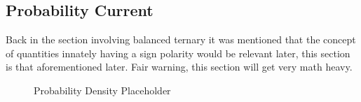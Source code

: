 \documentclass[a4paper]{article}
\begin{document}


\subsection{Probability Current} %
\label{ternaryRelevance} %

Back in the section involving balanced ternary it was mentioned that the concept of quantities innately having a sign polarity would be relevant later, this section is that aforementioned later. Fair warning, this section will get very math heavy. \newline
\newline


\label{FigureisThecommandYouAlwaysForget}%
\label{captionIsTheOtherOne}




\begin{figure} %
	\caption{Probability Density Placeholder}\label{ProbDensity1}
\end{figure}
\end{document}
